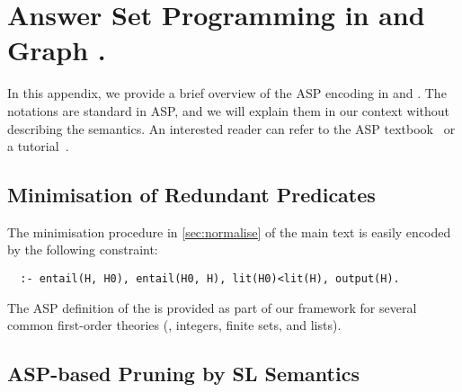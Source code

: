 \appendix
\label{sec:appendix}

\section{Answer Set Programming in \tool and Graph \ggen.}
In this appendix, we provide a brief overview of the ASP encoding in \tool and \ggen. The notations are standard in ASP, and we will explain them in our context without describing the semantics. An interested reader can refer to the ASP textbook~\cite{lifschitz2019answer} or a tutorial~\cite{aspguide}.

\subsection{Minimisation of Redundant Predicates}
\label{app:minimisation}

The minimisation procedure in \autoref{sec:normalise} of the main text is easily encoded by
the following constraint:
%
\begin{verbatim}
  :- entail(H, H0), entail(H0, H), lit(H0)<lit(H), output(H).
\end{verbatim}
%
The ASP definition of the  is provided as part of
our framework for several common first-order theories (\eg, integers,
finite sets, and lists).



\subsection{ASP-based Pruning by SL Semantics}
\label{app:slsemantics}


